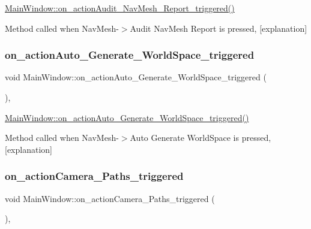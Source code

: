 \hyperlink{class_main_window_a6baa49b83387847510b49f0e93e0a508}{Main\+Window\+::on\+\_\+action\+Audit\+\_\+\+Nav\+Mesh\+\_\+\+Report\+\_\+triggered()} 

Method called when Nav\+Mesh-\/$>$Audit Nav\+Mesh Report is pressed, \mbox{[}explanation\mbox{]} \mbox{\label{class_main_window_a967d58b1c44e2c438b3d1387852856f1}} 
\subsubsection{\texorpdfstring{on\+\_\+action\+Auto\+\_\+\+Generate\+\_\+\+World\+Space\+\_\+triggered}{on\_actionAuto\_Generate\_WorldSpace\_triggered}}
{\footnotesize\ttfamily void Main\+Window\+::on\+\_\+action\+Auto\+\_\+\+Generate\+\_\+\+World\+Space\+\_\+triggered (\begin{DoxyParamCaption}{ }\end{DoxyParamCaption})\hspace{0.3cm}{\ttfamily [private]}, {\ttfamily [slot]}}



\hyperlink{class_main_window_a967d58b1c44e2c438b3d1387852856f1}{Main\+Window\+::on\+\_\+action\+Auto\+\_\+\+Generate\+\_\+\+World\+Space\+\_\+triggered()} 

Method called when Nav\+Mesh-\/$>$Auto Generate World\+Space is pressed, \mbox{[}explanation\mbox{]} \mbox{\label{class_main_window_a11bc264b622ed0f4e4edc3ec2924b799}} 
\subsubsection{\texorpdfstring{on\+\_\+action\+Camera\+\_\+\+Paths\+\_\+triggered}{on\_actionCamera\_Paths\_triggered}}
{\footnotesize\ttfamily void Main\+Window\+::on\+\_\+action\+Camera\+\_\+\+Paths\+\_\+triggered (\begin{DoxyParamCaption}{ }\end{DoxyParamCaption})\hspace{0.3cm}{\ttfamily [private]}, {\ttfamily [slot]}}



